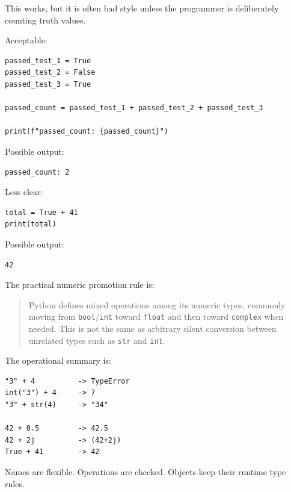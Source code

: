 This works, but it is often bad style unless the programmer is deliberately counting truth values.

Acceptable:

\begin{verbatim}
passed_test_1 = True
passed_test_2 = False
passed_test_3 = True

passed_count = passed_test_1 + passed_test_2 + passed_test_3

print(f"passed_count: {passed_count}")
\end{verbatim}

Possible output:

\begin{verbatim}
passed_count: 2
\end{verbatim}

Less clear:

\begin{verbatim}
total = True + 41
print(total)
\end{verbatim}

Possible output:

\begin{verbatim}
42
\end{verbatim}

The practical numeric promotion rule is:

\begin{quote}
Python defines mixed operations among its numeric types, commonly moving from \texttt{bool}/\texttt{int} toward \texttt{float} and then toward \texttt{complex} when needed. This is not the same as arbitrary silent conversion between unrelated types such as \texttt{str} and \texttt{int}.
\end{quote}

The operational summary is:

\begin{verbatim}
"3" + 4          -> TypeError
int("3") + 4     -> 7
"3" + str(4)     -> "34"

42 + 0.5         -> 42.5
42 + 2j          -> (42+2j)
True + 41        -> 42
\end{verbatim}

Names are flexible. Operations are checked. Objects keep their runtime type rules.